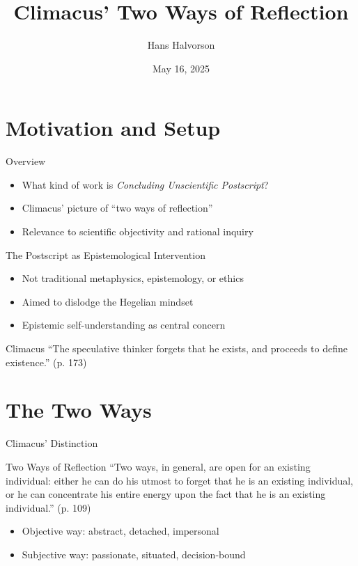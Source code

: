 \documentclass[12pt]{beamer}
\title{Climacus' Two Ways of Reflection}
\author{Hans Halvorson}
\date{May 16, 2025}
\begin{document}
\maketitle

\section{Motivation and Setup}

\begin{frame}{Overview}
\begin{itemize}
  \item What kind of work is \emph{Concluding Unscientific Postscript}?
  \item Climacus’ picture of “two ways of reflection”
  \item Relevance to scientific objectivity and rational inquiry
\end{itemize}
\end{frame}

\begin{frame}{The Postscript as Epistemological Intervention}
\begin{itemize}
  \item Not traditional metaphysics, epistemology, or ethics
  \item Aimed to dislodge the Hegelian mindset
  \item Epistemic self-understanding as central concern
\end{itemize}
\begin{block}{Climacus}
“The speculative thinker forgets that he exists, and proceeds to define existence.” (p. 173)
\end{block}
\end{frame}

\section{The Two Ways}

\begin{frame}{Climacus’ Distinction}
\begin{block}{Two Ways of Reflection}
“Two ways, in general, are open for an existing individual: either he can do his utmost to forget that he is an existing individual, or he can concentrate his entire energy upon the fact that he is an existing individual.” (p. 109)
\end{block}
\begin{itemize}
  \item Objective way: abstract, detached, impersonal
  \item Subjective way: passionate, situated, decision-bound
\end{itemize}
\end{frame}
\end{document}
